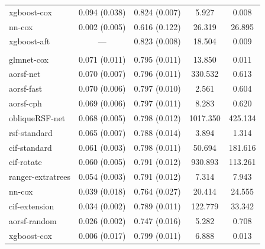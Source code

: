 \documentclass{article}\usepackage[]{graphicx}\usepackage[]{xcolor}
\newenvironment{knitrout}{}{} %
\begin{document}
\begin{knitrout}
\begin{longtable}[t]{lcccc}
\hspace{1em}xgboost-cox & 0.094 (0.038) & 0.824 (0.007) & 5.927 & 0.008\\
\hspace{1em}nn-cox & 0.002 (0.005) & 0.616 (0.122) & 26.319 & 26.895\\
\hspace{1em}xgboost-aft & --- & 0.823 (0.008) & 18.504 & 0.009\\
\addlinespace[0.3em]
\multicolumn{5}{l}{\textit{\textbf{SPRINT; CVD death, n = 9361, p = 174}}}\\
\hline
\hspace{1em}glmnet-cox & 0.071 (0.011) & 0.795 (0.011) & 13.850 & 0.011\\
\hspace{1em}aorsf-net & 0.070 (0.007) & 0.796 (0.011) & 330.532 & 0.613\\
\hspace{1em}aorsf-fast & 0.070 (0.006) & 0.797 (0.010) & 2.561 & 0.604\\
\hspace{1em}aorsf-cph & 0.069 (0.006) & 0.797 (0.011) & 8.283 & 0.620\\
\hspace{1em}obliqueRSF-net & 0.068 (0.005) & 0.798 (0.012) & 1017.350 & 425.134\\
\hspace{1em}rsf-standard & 0.065 (0.007) & 0.788 (0.014) & 3.894 & 1.314\\
\hspace{1em}cif-standard & 0.061 (0.003) & 0.798 (0.011) & 50.694 & 181.616\\
\hspace{1em}cif-rotate & 0.060 (0.005) & 0.791 (0.012) & 930.893 & 113.261\\
\hspace{1em}ranger-extratrees & 0.054 (0.003) & 0.791 (0.012) & 7.314 & 7.943\\
\hspace{1em}nn-cox & 0.039 (0.018) & 0.764 (0.027) & 20.414 & 24.555\\
\hspace{1em}cif-extension & 0.034 (0.002) & 0.789 (0.011) & 122.779 & 33.342\\
\hspace{1em}aorsf-random & 0.026 (0.002) & 0.747 (0.016) & 5.282 & 0.708\\
\hspace{1em}xgboost-cox & 0.006 (0.017) & 0.799 (0.011) & 6.888 & 0.013\\

\end{longtable}
\end{knitrout}
\end{document}
